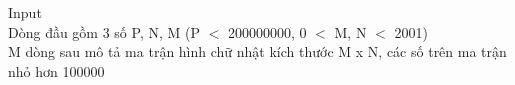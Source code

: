 Input
\\   Dòng đầu gồm 3 số P, N, M (P $<$ 200000000, 0 $<$ M, N $<$ 2001)   
\\   M dòng sau mô tả ma trận hình chữ nhật kích thước M x N, các số trên ma trận nhỏ hơn 100000